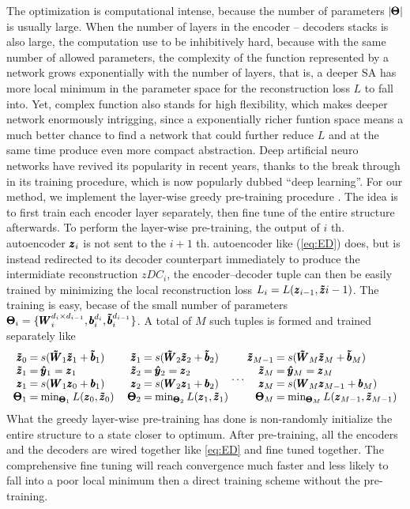 The optimization is computational intense, because the number of parameters $|\pmb{\Theta}|$ is usually large. When the number of layers in the encoder -- decoders stacks is also large, the computation use to be inhibitively hard, because with the same number of allowed parameters, the complexity of the function represented by a network grows exponentially with the number of layers, that is, a deeper SA has more local minimum in the parameter space for the reconstruction loss $L$ to fall into. Yet, complex function also stands for high flexibility, which makes deeper network enormously intrigging, since a exponentially richer funtion space means a much better chance to find a network that could further reduce $L$ and at the same time produce even more compact abstraction. Deep artificial neuro networks have revived its popularity in recent years, thanks to the break through in its training procedure, which is now popularly dubbed ``deep learning''. For our method, we implement the layer-wise greedy pre-training procedure \cite{DL:DBN1, DL:SDA1}. The idea is to first train each encoder layer separately, then fine tune of the entire structure afterwards. To perform the layer-wise pre-training, the output of $i$ th. autoencoder $\pmb{z}_i$ is not sent to the $i+1$ th. autoencoder like (\ref{eq:ED}) does, but is instead redirected to its decoder counterpart immediately to produce the intermidiate reconstruction $zDC_i$, the encoder--decoder tuple can then be easily trained by minimizing the local reconstruction loss $L_i=L(\pmb{z}_{i-1}, \pmb{\tilde{z}}{i-1})$. The training is easy, becase of the small number of parameters $\pmb{\Theta}_i=\{\pmb{W}_{i}^{d_{i} \times d_{i-1}}, \pmb{b}_{i}^{d_{i}}, \pmb{\tilde{b}}_{i}^{d_{i-1}}\}$. A total of $M$ such tuples is formed and trained separately like
\newcommand{\ED}[2]
{
  \arraycolsep=1.2pt
  \begin{array}{rcl}
    \zDC_{#1} &=& s(\WDC_{#2}\zDC_{#2} + \bDC_{#2}) \\
    \zDC_{#2} &=& \yHT_{#2} = \zEC_{#2} \\
    \zEC_{#2} &=& s(\WEC_{#2}\zEC_{#1} + \bEC_{#2}) \\
    \Par_{#2} &=& \min_{\Par_#2}L(\zEC_{#1},\zDC_{#1})
  \end{array}
}
\begin{equation}\label{eq:Greedy}
\begin{array}{cc}
  \ED{0}{1} \quad \ED{1}{2} \dots \ED{M-1}{M}
\end{array}
\end{equation}
What the greedy layer-wise pre-training has done is non-randomly initialize the entire structure to a state closer to optimum. After pre-training, all the encoders and the decoders are wired together like \ref{eq:ED} and fine tuned together. The comprehensive fine tuning will reach convergence much faster and less likely to fall into a poor local minimum then a direct training scheme without the pre-training. 

